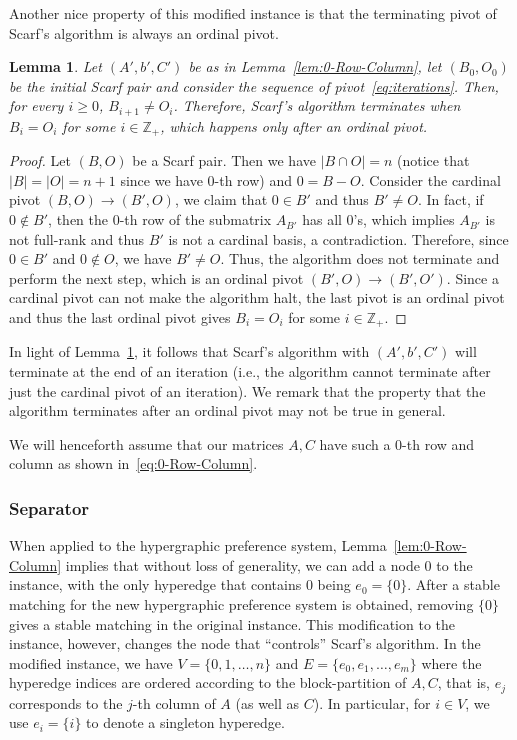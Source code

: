 \documentclass[11pt]{article}
\newtheorem{lemma}[theorem]{Lemma}
\begin{document}
Another nice property of this modified instance is that the terminating pivot of Scarf's algorithm is always an ordinal pivot.

\begin{lemma}\label{lem:last-ordinal}
    Let $(A',b',C')$ be as in Lemma~\ref{lem:0-Row-Column}, let $(B_0,O_0)$ be the initial Scarf pair and consider the sequence of pivot~\eqref{eq:iterations}. Then, for every $i\ge 0$, $B_{i+1}\neq O_i$. Therefore, Scarf's algorithm terminates when $B_i=O_i$ for some $i\in\mathbb{Z}_+$, which happens only after an ordinal pivot.
\end{lemma}

\begin{proof}
    Let $(B,O)$ be a Scarf pair. Then we have $|B\cap O|=n$ (notice that $|B|=|O|=n+1$ since we have $0$-th row) and $0=B-O$. Consider the cardinal pivot $(B,O)\to (B',O)$, we claim that $0\in B'$ and thus $B'\neq O$. In fact, if $0\notin B'$, then the $0$-th row of the submatrix $A_{B'}$ has all $0$'s, which implies $A_{B'}$ is not full-rank and thus $B'$ is not a cardinal basis, a contradiction. Therefore, since $0\in B'$ and $0\notin O$, we have $B'\neq O$. Thus, the algorithm does not terminate and perform the next step, which is an ordinal pivot $(B',O)\to (B',O')$. Since a cardinal pivot can not make the algorithm halt, the last pivot is an ordinal pivot and thus the last ordinal pivot gives $B_i=O_i$ for some $i\in\mathbb{Z}_+$. 
\end{proof}

In light of Lemma~\ref{lem:last-ordinal}, it follows that Scarf's algorithm with $(A',b',C')$ will terminate at the end of an iteration (i.e., the algorithm cannot terminate after just the cardinal pivot of an iteration). We remark that the property that the algorithm terminates after an ordinal pivot may not be true in general.

We will henceforth assume that our matrices $A,C$ have such a $0$-th row and column as shown in~\eqref{eq:0-Row-Column}. 

\subsubsection{Separator}

When applied to the hypergraphic preference system, Lemma~\ref{lem:0-Row-Column} implies that without loss of generality, we can add a node $0$ to the instance, with the only hyperedge that contains $0$ being $e_0=\{0\}$. After a stable matching for the new hypergraphic preference system is obtained, removing $\{0\}$ gives a stable matching in the original instance. This modification to the instance, however, changes the node that ``controls'' Scarf's algorithm. In the modified instance, we have $V=\{0,1,\dots,n\}$ and $E=\{e_0,e_1,\dots,e_m\}$ where the hyperedge indices are ordered according to the block-partition of $A,C$, that is, $e_j$ corresponds to the $j$-th column of $A$ (as well as $C$). In particular, for $i\in V$, we use $e_i=\{i\}$ to denote a singleton hyperedge. 
\end{document}
